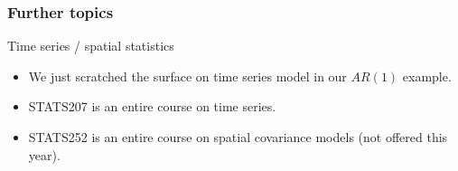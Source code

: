 \documentclass[handout]{beamer}
\begin{document}
   \begin{frame} \frametitle{Further topics}

   \begin{block}
   {Time series / spatial statistics}
   \begin{itemize}
   \item We just scratched the surface on
   time series model in our $AR(1)$ example.
   \item STATS207 is an entire course on time series.
   \item STATS252 is an entire course on spatial covariance models
   (not offered this year).
   \end{itemize}
   \end{block}
   \end{frame}


   \begin{frame} 

   \end{frame}

   
\end{document}
